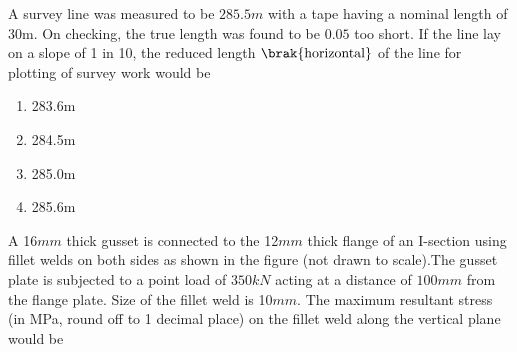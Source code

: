         
    \item A survey line was measured to be $285.5m$ with a tape having a nominal length of 30m. On 
        checking, the true length was found to be $0.05$ too short. If the line lay on a slope of 
        1 in 10, the reduced length $\brak{\text{horizontal}}$ of the line for plotting of survey work
        would be
        \hfill{}
        \begin{multicols}{4}
            \begin{enumerate}
                \item 283.6m
                    \columnbreak
                \item 284.5m
                    \columnbreak
                \item 285.0m
                    \columnbreak
                \item 285.6m
            \end{enumerate}
        \end{multicols}
    \item A 16$mm$ thick gusset is connected to the 12$mm$ thick flange of an I-section using fillet welds on
        both sides as shown in the figure (not drawn to scale).The gusset plate is subjected to a point load 
        of $350kN$ acting at a distance of $100mm$ from the flange plate. Size of the fillet weld is 10$mm$.
        The maximum resultant stress (in MPa, round off to 1 decimal place) on the fillet weld along the vertical plane would be

